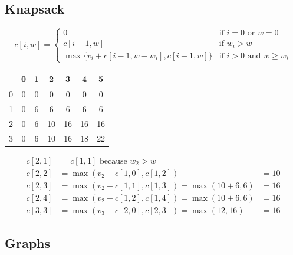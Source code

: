 \documentclass{article}
\begin{document}
\begin{multicols*}{2}
    \subsection*{Knapsack}
    \begin{equation*}
        c[i, w] = \begin{cases}
            0                                      & \text{if }i = 0 \text{ or } w = 0        \\
            c[i - 1, w]                            & \text{if }w_i > w                        \\
            \max\{v_i + c[i-1, w-w_i], c[i-1, w]\} & \text{if } i > 0 \text{ and } w \geq w_i
        \end{cases}
    \end{equation*}

    \scriptsize
    \setlength{\columnsep}{-13em}
    \begin{multicols}{2}
        \begin{tabular}{c|cccccc}
              & 0 & 1 & 2  & 3  & 4  & 5  \\
            \hline
            0 & 0 & 0 & 0  & 0  & 0  & 0  \\
            1 & 0 & 6 & 6  & 6  & 6  & 6  \\
            2 & 0 & 6 & 10 & 16 & 16 & 16 \\
            3 & 0 & 6 & 10 & 16 & 18 & 22
        \end{tabular}
        \columnbreak
        \begin{align*}
            c[2,1]  & = c[1,1] \text{ because } w_2 > w                     \\
            c[2,2]  & = \max(v_2 + c[1,0], c[1,2])                   & = 10 \\
            c[2, 3] & = \max(v_2 + c[1,1], c[1,3]) = \max(10 + 6, 6) & = 16 \\
            c[2,4]  & = \max(v_2 + c[1,2], c[1,4]) = \max(10+6, 6)   & = 16 \\
            c[3,3]  & = \max(v_3 + c[2,0], c[2,3]) = \max(12, 16)    & = 16
        \end{align*}
    \end{multicols}

    \small
    \setlength{\columnsep}{0em}

    \subsection*{Graphs}

\end{multicols*}
\end{document}
